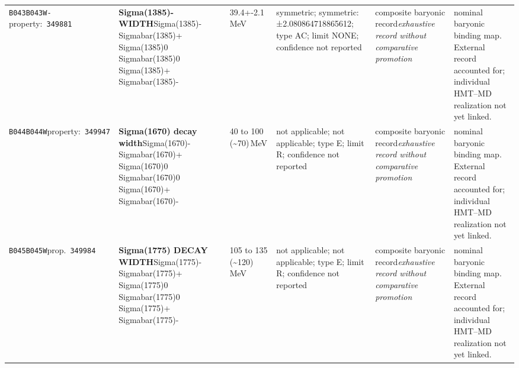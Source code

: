 \begin{landscape}
\begin{longtable}{L{1.85cm}L{4.45cm}L{2.35cm}L{4.05cm}L{3.35cm}L{7.15cm}}
\texttt{B043}\newline \texttt{B043W-}\newline property:\ \texttt{349881} & \textbf{Sigma(1385)- WIDTH}\newline Sigma(1385)- \textbar{}\allowbreak{} Sigmabar(1385)+ \textbar{}\allowbreak{} Sigma(1385)0 \textbar{}\allowbreak{} Sigmabar(1385)0 \textbar{}\allowbreak{} Sigma(1385)+ \textbar{}\allowbreak{} Sigmabar(1385)- & 39.4+-2.1\,MeV & symmetric; symmetric: ±2.080864718865612; type AC; limit NONE; confidence not reported & composite baryonic record\newline \emph{exhaustive record without comparative promotion} & nominal baryonic binding map. External record accounted for; individual HMT--MD realization not yet linked. \\
\texttt{B044}\newline \texttt{B044W}\newline property:\ \texttt{349947} & \textbf{Sigma(1670) decay width}\newline Sigma(1670)- \textbar{}\allowbreak{} Sigmabar(1670)+ \textbar{}\allowbreak{} Sigma(1670)0 \textbar{}\allowbreak{} Sigmabar(1670)0 \textbar{}\allowbreak{} Sigma(1670)+ \textbar{}\allowbreak{} Sigmabar(1670)- & 40 to 100 (\textasciitilde{}70)\,MeV & not applicable; not applicable; type E; limit R; confidence not reported & composite baryonic record\newline \emph{exhaustive record without comparative promotion} & nominal baryonic binding map. External record accounted for; individual HMT--MD realization not yet linked. \\
\texttt{B045}\newline \texttt{B045W}\newline prop.\ \texttt{349984} & \textbf{Sigma(1775) DECAY WIDTH}\newline Sigma(1775)- \textbar{}\allowbreak{} Sigmabar(1775)+ \textbar{}\allowbreak{} Sigma(1775)0 \textbar{}\allowbreak{} Sigmabar(1775)0 \textbar{}\allowbreak{} Sigma(1775)+ \textbar{}\allowbreak{} Sigmabar(1775)- & 105 to 135 (\textasciitilde{}120)\,MeV & not applicable; not applicable; type E; limit R; confidence not reported & composite baryonic record\newline \emph{exhaustive record without comparative promotion} & nominal baryonic binding map. External record accounted for; individual HMT--MD realization not yet linked. \\

\end{longtable}
\end{landscape}
